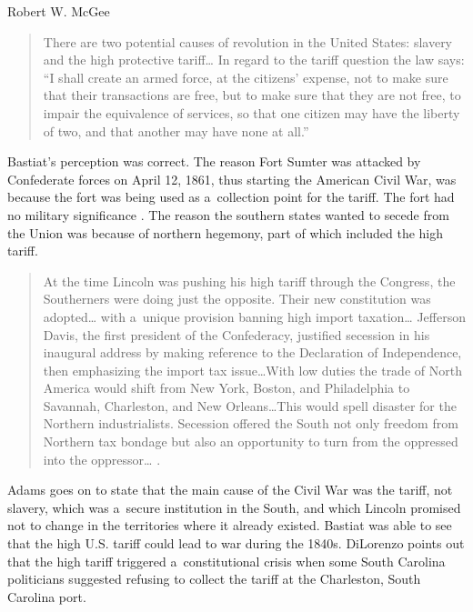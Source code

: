 \begin{artengenv}{Robert W. McGee}
\begin{quote}
There are two potential causes of revolution in the United States: slavery and the high protective tariff… In regard to the tariff question the law says: ``I shall create an armed force, at the citizens' expense, not to make sure that their transactions are free, but to make sure that they are not free, to impair the equivalence of services, so that one citizen may have the liberty of two, and that another may have none at all.'' 
\parencite[][p.462]{bastiat_economic_1964-1}%
\end{quote}




Bastiat's perception was correct. The reason Fort Sumter was attacked by Confederate forces on April 12, 1861, thus starting the American Civil War, was because the fort was being used as a~collection point for the tariff. The fort had no military significance 
\parencite[][pp.17–33]{adams_when_2000}. %
 The reason the southern states wanted to secede from the Union was because of northern hegemony, part of which included the high tariff.



\begin{quote}
At the time Lincoln was pushing his high tariff through the Congress, the Southerners were doing just the opposite. Their new constitution was adopted… with a~unique provision banning high import taxation… Jefferson Davis, the first president of the Confederacy, justified secession in his inaugural address by making reference to the Declaration of Independence, then emphasizing the import tax issue…With low duties the trade of North America would shift from New York, Boston, and Philadelphia to Savannah, Charleston, and New Orleans…This would spell disaster for the Northern industrialists. Secession offered the South not only freedom from Northern tax bondage but also an opportunity to turn from the oppressed into the oppressor… 
\parencite[][p.332]{adams_for_1993}.%
\end{quote}




Adams 
\parencite*[][pp.332–333]{adams_for_1993} %
 goes on to state that the main cause of the Civil War was the tariff, not slavery, which was a~secure institution in the South, and which Lincoln promised not to change in the territories where it already existed. Bastiat 
\parencite*[][p.462]{bastiat_economic_1964-1} %
 was able to see that the high U.S. tariff could lead to war during the 1840s. DiLorenzo 
\parencite*[][p.63]{dilorenzo_real_2002} %
 points out that the high tariff triggered a~constitutional crisis when some South Carolina politicians suggested refusing to collect the tariff at the Charleston, South Carolina port.




\end{artengenv}
